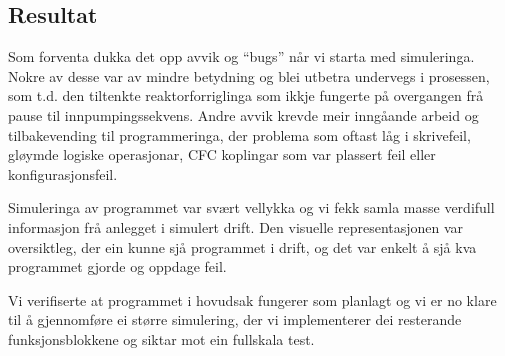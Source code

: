 \newpage

\subsection{Resultat}

Som forventa dukka det opp avvik og ``bugs'' når vi starta med simuleringa.
Nokre av desse var av mindre betydning og blei utbetra undervegs i prosessen, som t.d. den tiltenkte
reaktorforriglinga som ikkje fungerte på overgangen frå pause til innpumpingssekvens. \newline
Andre avvik krevde meir inngåande arbeid og tilbakevending til programmeringa, der problema som oftast låg i skrivefeil, gløymde logiske operasjonar,
\gls{CFC} koplingar som var plassert feil eller konfigurasjonsfeil.

Simuleringa av programmet var svært vellykka og vi fekk samla masse verdifull informasjon frå anlegget i simulert drift. 
Den visuelle representasjonen var oversiktleg, der ein kunne sjå programmet i drift, og det var enkelt å sjå kva programmet gjorde og oppdage feil. 

Vi verifiserte at programmet i hovudsak fungerer som planlagt og vi er no klare til å gjennomføre ei større simulering,
der vi implementerer dei resterande funksjonsblokkene og siktar mot ein fullskala test.





